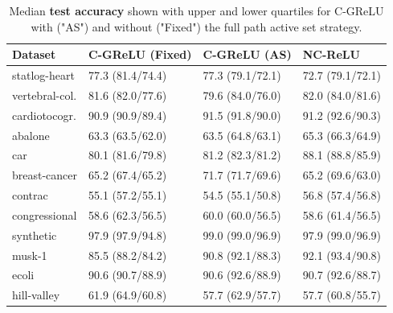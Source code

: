 \begin{table}
	\centering
	\begin{tabular}{llll} \toprule
		\textbf{Dataset} & \textbf{C-GReLU (Fixed)} & \textbf{C-GReLU (AS)} & \textbf{NC-ReLU} \\ \midrule
		statlog-heart    & 77.3 (81.4/74.4)         & 77.3 (79.1/72.1)      & 72.7 (79.1/72.1) \\
		vertebral-col.   & 81.6 (82.0/77.6)         & 79.6 (84.0/76.0)      & 82.0 (84.0/81.6) \\
		cardiotocogr.    & 90.9 (90.9/89.4)         & 91.5 (91.8/90.0)      & 91.2 (92.6/90.3) \\
		abalone          & 63.3 (63.5/62.0)         & 63.5 (64.8/63.1)      & 65.3 (66.3/64.9) \\
		car              & 80.1 (81.6/79.8)         & 81.2 (82.3/81.2)      & 88.1 (88.8/85.9) \\
		breast-cancer    & 65.2 (67.4/65.2)         & 71.7 (71.7/69.6)      & 65.2 (69.6/63.0) \\
		contrac          & 55.1 (57.2/55.1)         & 54.5 (55.1/50.8)      & 56.8 (57.4/56.8) \\
		congressional    & 58.6 (62.3/56.5)         & 60.0 (60.0/56.5)      & 58.6 (61.4/56.5) \\
		synthetic        & 97.9 (97.9/94.8)         & 99.0 (99.0/96.9)      & 97.9 (99.0/96.9) \\
		musk-1           & 85.5 (88.2/84.2)         & 90.8 (92.1/88.3)      & 92.1 (93.4/90.8) \\
		ecoli            & 90.6 (90.7/88.9)         & 90.6 (92.6/88.9)      & 90.7 (92.6/88.7) \\
		hill-valley      & 61.9 (64.9/60.8)         & 57.7 (62.9/57.7)      & 57.7 (60.8/55.7) \\ \bottomrule
	\end{tabular}
	\caption{Median \textbf{test accuracy} shown with upper and lower quartiles for C-GReLU with ("AS") and without ("Fixed") the full path active set strategy.}%
	\label{table:active-set-gated-acc}
\end{table}
